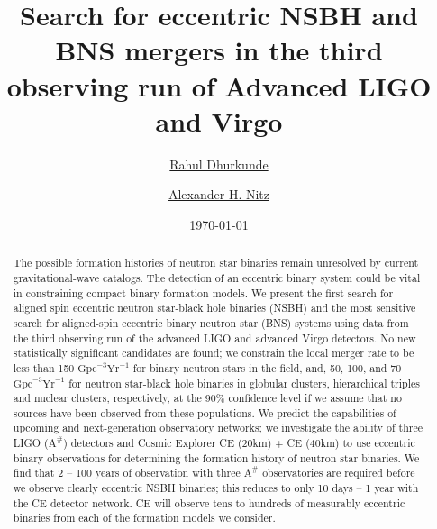 \documentclass[floatfix,lengthcheck,showpacs,amssymb,amsmath,amsfonts,twocolumn,nofootinbib,longbibliography]{revtex4-1}
\begin{document}
\author{\href{https://orcid.org/0000-0002-5077-8916}{Rahul Dhurkunde}} 
\author{\href{https://orcid.org/0000-0002-1850-4587}{Alexander H. Nitz}}


\date{\today}
\title{Search for eccentric NSBH and BNS mergers in the third observing run of Advanced LIGO and Virgo}
 
\begin{abstract}
The possible formation histories of neutron star binaries remain unresolved by current gravitational-wave catalogs. The detection of an eccentric binary system could be vital in constraining compact binary formation models. We present the first search for aligned spin eccentric neutron star-black hole binaries (NSBH) and the most sensitive search for aligned-spin eccentric binary neutron star (BNS) systems using data from the third observing run of the advanced LIGO and advanced Virgo detectors. No new statistically significant candidates are found; we constrain the local merger rate to be less than 150 $\text{Gpc}^{-3}\text{Yr}^{-1}$ for binary neutron stars in the field, and, 50, 100, and 70 $\text{Gpc}^{-3}\text{Yr}^{-1}$ for neutron star-black hole binaries in globular clusters, hierarchical triples and nuclear clusters, respectively, at the 90$\%$ confidence level if we assume that no sources have been observed from these populations. We predict the capabilities of upcoming and next-generation observatory networks; we investigate the ability of three LIGO ($\text{A}^{\#}$) detectors and Cosmic Explorer CE (20km) + CE (40km) to use eccentric binary observations for determining the formation history of neutron star binaries. We find that 2 -- 100 years of observation with three $\text{A}^{\#}$ observatories are required before we observe clearly eccentric NSBH binaries; this reduces to only 10 days -- 1 year with the CE detector network. CE will 
observe tens to hundreds of measurably eccentric binaries from
each of the formation models we consider.
\end{abstract}
 \maketitle
\end{document}
